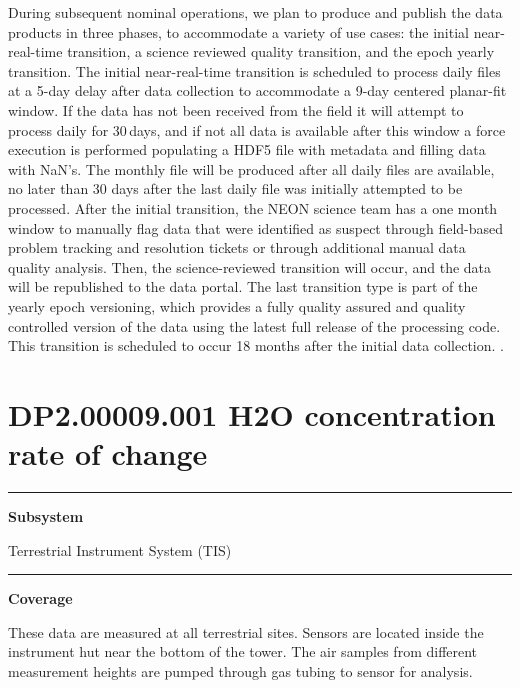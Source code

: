 \documentclass[]{article}
\begin{document}
During subsequent nominal operations, we plan to produce and publish the
data products in three phases, to accommodate a variety of use cases:
the initial near-real-time transition, a science reviewed quality
transition, and the epoch yearly transition. The initial near-real-time
transition is scheduled to process daily files at a 5-day delay after
data collection to accommodate a 9-day centered planar-fit window. If
the data has not been received from the field it will attempt to process
daily for 30\,days, and if not all data is available after this window a
force execution is performed populating a HDF5 file with metadata and
filling data with NaN's. The monthly file will be produced after all
daily files are available, no later than 30 days after the last daily
file was initially attempted to be processed. After the initial
transition, the NEON science team has a one month window to manually
flag data that were identified as suspect through field-based problem
tracking and resolution tickets or through additional manual data
quality analysis. Then, the science-reviewed transition will occur, and
the data will be republished to the data portal. The last transition
type is part of the yearly epoch versioning, which provides a fully
quality assured and quality controlled version of the data using the
latest full release of the processing code. This transition is scheduled
to occur 18 months after the initial data collection. \newpage
.

\section{DP2.00009.001 H2O concentration rate of
change}\label{dp2.00009.001-h2o-concentration-rate-of-change}

\begin{center}\rule{0.5\linewidth}{\linethickness}\end{center}

\textbf{Subsystem}

Terrestrial Instrument System (TIS)

\begin{center}\rule{0.5\linewidth}{\linethickness}\end{center}

\textbf{Coverage}

These data are measured at all terrestrial sites. Sensors are located
inside the instrument hut near the bottom of the tower. The air samples
from different measurement heights are pumped through gas tubing to
sensor for analysis.
\end{document}
